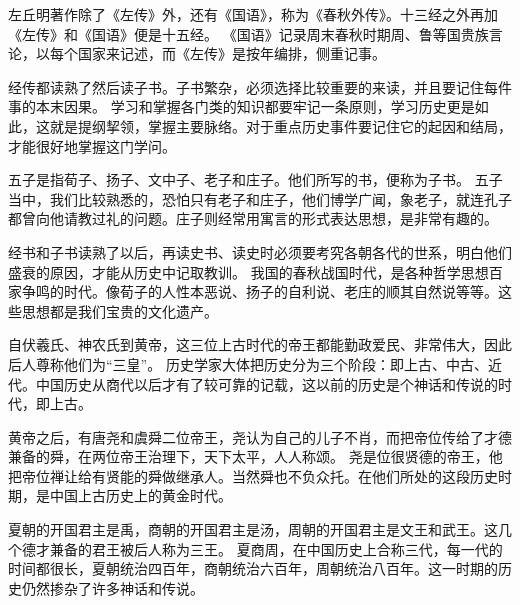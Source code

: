 \documentclass[avery5371,grid]{flashcards}
\begin{document}
{左丘明著作除了《左传》外，还有《国语》，称为《春秋外传》。十三经之外再加《左传》和《国语》便是十五经。} %
{《国语》记录周末春秋时期周、鲁等国贵族言论，以每个国家来记述，而《左传》是按年编排，侧重记事。} %


{经传都读熟了然后读子书。子书繁杂，必须选择比较重要的来读，并且要记住每件事的本末因果。} %
{学习和掌握各门类的知识都要牢记一条原则，学习历史更是如此，这就是提纲挈领，掌握主要脉络。对于重点历史事件要记住它的起因和结局，才能很好地掌握这门学问。} %

{五子是指荀子、扬子、文中子、老子和庄子。他们所写的书，便称为子书。} %
{五子当中，我们比较熟悉的，恐怕只有老子和庄子，他们博学广闻，象老子，就连孔子都曾向他请教过礼的问题。庄子则经常用寓言的形式表达思想，是非常有趣的。} %


{经书和子书读熟了以后，再读史书、读史时必须要考究各朝各代的世系，明白他们盛衰的原因，才能从历史中记取教训。} %
{我国的春秋战国时代，是各种哲学思想百家争鸣的时代。像荀子的人性本恶说、扬子的自利说、老庄的顺其自然说等等。这些思想都是我们宝贵的文化遗产。} %

{自伏羲氏、神农氏到黄帝，这三位上古时代的帝王都能勤政爱民、非常伟大，因此后人尊称他们为“三皇”。} %
{历史学家大体把历史分为三个阶段：即上古、中古、近代。中国历史从商代以后才有了较可靠的记载，这以前的历史是个神话和传说的时代，即上古。} %

{黄帝之后，有唐尧和虞舜二位帝王，尧认为自己的儿子不肖，而把帝位传给了才德兼备的舜，在两位帝王治理下，天下太平，人人称颂。} %
{尧是位很贤德的帝王，他把帝位禅让给有贤能的舜做继承人。当然舜也不负众托。在他们所处的这段历史时期，是中国上古历史上的黄金时代。} %

{夏朝的开国君主是禹，商朝的开国君主是汤，周朝的开国君主是文王和武王。这几个德才兼备的君王被后人称为三王。} %
{夏商周，在中国历史上合称三代，每一代的时间都很长，夏朝统治四百年，商朝统治六百年，周朝统治八百年。这一时期的历史仍然掺杂了许多神话和传说。} %
\end{document}
